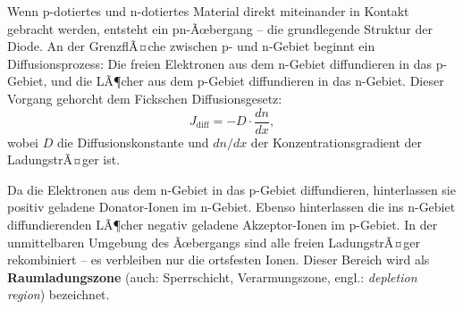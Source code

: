 ﻿\documentclass[12pt, a4paper]{article}
\begin{document}
	Wenn p-dotiertes und n-dotiertes Material direkt miteinander in Kontakt gebracht
	werden, entsteht ein pn-Ãœbergang -- die grundlegende Struktur der Diode. An
	der GrenzflÃ¤che zwischen p- und n-Gebiet beginnt ein Diffusionsprozess: Die
	freien Elektronen aus dem n-Gebiet diffundieren in das p-Gebiet, und die LÃ¶cher
	aus dem p-Gebiet diffundieren in das n-Gebiet. Dieser Vorgang gehorcht dem
	Fickschen Diffusionsgesetz:
	\begin{equation}
		J_{\mathrm{diff}} = -D \cdot \frac{dn}{dx},
	\end{equation}
	wobei $D$ die Diffusionskonstante und $dn/dx$ der Konzentrationsgradient der
	LadungstrÃ¤ger ist.
	
	Da die Elektronen aus dem n-Gebiet in das p-Gebiet diffundieren, hinterlassen
	sie positiv geladene Donator-Ionen im n-Gebiet. Ebenso hinterlassen die ins
	n-Gebiet diffundierenden LÃ¶cher negativ geladene Akzeptor-Ionen im p-Gebiet.
	In der unmittelbaren Umgebung des Ãœbergangs sind alle freien LadungstrÃ¤ger
	rekombiniert -- es verbleiben nur die ortsfesten Ionen. Dieser Bereich wird als
	\textbf{Raumladungszone} (auch: Sperrschicht, Verarmungszone, engl.:
	\textit{depletion region}) bezeichnet.
	
\end{document}

